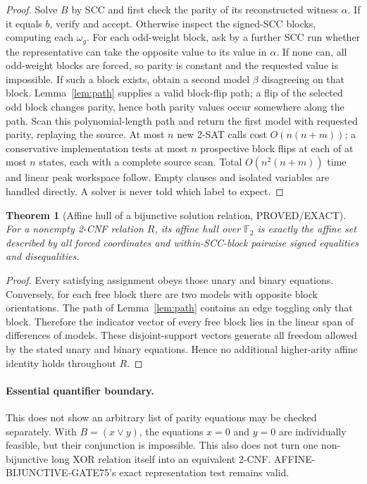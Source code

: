 \documentclass[11pt]{article}
\newtheorem{theorem}{Theorem}
\begin{document}
\begin{proof}
Solve $B$ by SCC and first check the parity of its reconstructed witness $\alpha$. If it equals $b$, verify and accept. Otherwise inspect the signed-SCC blocks, computing each $\omega_g$. For each odd-weight block, ask by a further SCC run whether the representative can take the opposite value to its value in $\alpha$. If none can, all odd-weight blocks are forced, so parity is constant and the requested value is impossible. If such a block exists, obtain a second model $\beta$ disagreeing on that block. Lemma~\ref{lem:path} supplies a valid block-flip path; a flip of the selected odd block changes parity, hence both parity values occur somewhere along the path. Scan this polynomial-length path and return the first model with requested parity, replaying the source. At most $n$ new 2-SAT calls cost $O(n(n+m))$; a conservative implementation tests at most $n$ prospective block flips at each of at most $n$ states, each with a complete source scan. Total $O(n^2(n+m))$ time and linear peak workspace follow. Empty clauses and isolated variables are handled directly. A solver is never told which label to expect.
\end{proof}

\begin{theorem}[Affine hull of a bijunctive solution relation, PROVED/EXACT]
For a nonempty 2-CNF relation $R$, its affine hull over $\mathbb F_2$ is exactly the affine set described by all forced coordinates and within-SCC-block pairwise signed equalities and disequalities.
\end{theorem}
\begin{proof}
Every satisfying assignment obeys those unary and binary equations. Conversely, for each free block there are two models with opposite block orientations. The path of Lemma~\ref{lem:path} contains an edge toggling only that block. Therefore the indicator vector of every free block lies in the linear span of differences of models. These disjoint-support vectors generate all freedom allowed by the stated unary and binary equations. Hence no additional higher-arity affine identity holds throughout $R$.
\end{proof}

\paragraph{Essential quantifier boundary.} This does not show an arbitrary list of parity equations may be checked separately. With $B=(x\vee y)$, the equations $x=0$ and $y=0$ are individually feasible, but their conjunction is impossible. This also does not turn one non-bijunctive long XOR relation itself into an equivalent 2-CNF. AFFINE-BIJUNCTIVE-GATE75's exact representation test remains valid.
\end{document}
